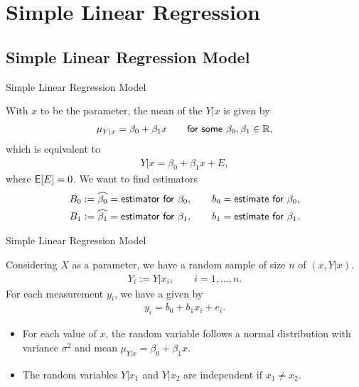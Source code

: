 \section{Simple Linear Regression}

\subsection{Simple Linear Regression Model}

\begin{frame}{Simple Linear Regression Model}

\justifying
{} With $x$ to be the parameter, the mean of the  $Y|x$ is given by 
\begin{align*}
\mu_{Y|x} = \beta_0 + \beta_1 x \qquad \mathsf{for\ some\ } \beta_0, \beta_1 \in \mathbb{R},
\end{align*}
which is equivalent to
\begin{align*}
Y|x = \beta_0 + \beta_1 x + E,
\end{align*}
where $\mathsf{E}[E] = 0$. We want to find estimators
\begin{align*}
B_0 & := \widehat{\beta_0} = \mathsf{estimator\ for\ } \beta_0, \qquad b_0 = \mathsf{estimate\ for\ } \beta_0, \\
B_1 & := \widehat{\beta_1} = \mathsf{estimator\ for\ } \beta_1, \qquad b_1 = \mathsf{estimate\ for\ } \beta_1.
\end{align*}

\end{frame}


\begin{frame}{Simple Linear Regression Model}

\justifying
{} Considering $X$ as a parameter, we have a random sample of size $n$ of $(x, Y|x)$.
\begin{align*}
Y_i := Y|x_i, \qquad i = 1,\ldots, n.
\end{align*}
For each measurement $y_i$, we have a  given by
\begin{align*}
y_i = b_0 + b_1x_i + e_i.
\end{align*}
\begin{itemize}
	\justifying
	\item For each value of $x$, the random variable follows a normal distribution with variance $\sigma^2$ and mean $\mu_{Y|x} = \beta_0 + \beta_1 x$.
	\item The random variables $Y|x_1$ and $Y|x_2$ are independent if $x_1\neq x_2$.
\end{itemize}


\end{frame}



